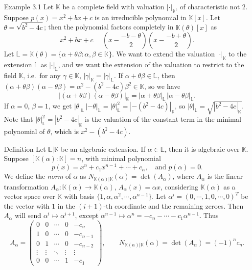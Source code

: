 \documentclass[11pt]{article}
\begin{document}
\begin{exbox}{Example 3.1}
Let $\mathbb{K}$ be a complete field with valuation $|\cdot|_{\mathbb{K}}$, of characteristic not $2$. Suppose $p(x) = x^2 + bx + c$ is an irreducible polynomial in $\mathbb{K}[x]$. Let $\theta = \sqrt{b^2 - 4c}$; then the polynomial factors completely in $\mathbb{K}(\theta)[x]$ as
\[
x^2 + bx + c = \left( x - \frac{-b - \theta}{2} \right)\left( x - \frac{-b + \theta}{2} \right) .
\]
Let $\mathbb{L} = \mathbb{K}(\theta) = \{ \alpha + \theta\beta : \alpha, \beta \in \mathbb{K} \}$. We want to extend the valuation $|\cdot|_{\mathbb{K}}$ to the extension $\mathbb{L}$ as $|\cdot|_{\mathbb{L}}$, and we want the extension of the valuation to restrict to the field $\mathbb{K}$, i.e.\ for any $\gamma \in \mathbb{K}$, $|\gamma|_{\mathbb{K}} = |\gamma|_{\mathbb{L}}$. If $\alpha + \theta\beta \in \mathbb{L}$, then $(\alpha + \theta\beta)(\alpha - \theta\beta) = \alpha^2 - (b^2 - 4c)\beta^2 \in \mathbb{K}$, so we have
\begin{equation}\label{eq:val-ext}
|(\alpha + \theta\beta)(\alpha - \theta\beta)|_{\mathbb{K}} = |\alpha + \theta\beta|_{\mathbb{L}}\, |\alpha - \theta\beta|_{\mathbb{L}} .
\end{equation}
If $\alpha = 0$, $\beta = 1$, we get $|\theta|_{\mathbb{L}}\,|-\theta|_{\mathbb{L}} = |\theta|_{\mathbb{L}}^2 = |-(b^2 - 4c)|_{\mathbb{K}}$, so $|\theta|_{\mathbb{L}} = \sqrt{|b^2 - 4c|_{\mathbb{K}}}$. Note that $|\theta|_{\mathbb{L}}^2 = |b^2 - 4c|_{\mathbb{K}}$ is the valuation of the constant term in the minimal polynomial of $\theta$, which is $x^2 - (b^2 - 4c)$.
\end{exbox}

\begin{defnbox}{Definition}
Let $\mathbb{L}|\mathbb{K}$ be an algebraic extension. If $\alpha \in \mathbb{L}$, then it is algebraic over $\mathbb{K}$. Suppose $[\mathbb{K}(\alpha) : \mathbb{K}] = n$, with minimal polynomial
\[
p(x) = x^n + c_1 x^{n-1} + \cdots + c_n, \quad\text{and } p(\alpha) = 0 .
\]
We define the \textit{norm} of $\alpha$ as $N_{\mathbb{K}(\alpha)|\mathbb{K}}(\alpha) = \det(A_\alpha)$, where $A_\alpha$ is the linear transformation $A_\alpha : \mathbb{K}(\alpha) \rightarrow \mathbb{K}(\alpha)$, $A_\alpha(x) = \alpha x$, considering $\mathbb{K}(\alpha)$ as a vector space over $\mathbb{K}$ with basis $\{1, \alpha, \alpha^2, \cdots, \alpha^{n-1}\}$. Let $\alpha^i = (0, \cdots, 1, 0, \cdots, 0)^T$ be the vector with $1$ in the $(i+1)$-th coordinate and the remaining zeroes. Then $A_\alpha$ will send $\alpha^i \mapsto \alpha^{i+1}$, except $\alpha^{n-1} \mapsto \alpha^n = -c_n - \cdots - c_1\alpha^{n-1}$. Thus
\[
A_\alpha = \begin{pmatrix}
0 & 0 & \cdots & 0 & -c_n \\
1 & 0 & \cdots & 0 & -c_{n-1} \\
0 & 1 & \cdots & 0 & -c_{n-2} \\
\vdots & \vdots & \ddots & \vdots & \vdots \\
0 & 0 & \cdots & 1 & -c_1
\end{pmatrix},
\qquad N_{\mathbb{K}(\alpha)|\mathbb{K}}(\alpha) = \det(A_\alpha) = (-1)^n c_n .
\]
\end{defnbox}
\end{document}
